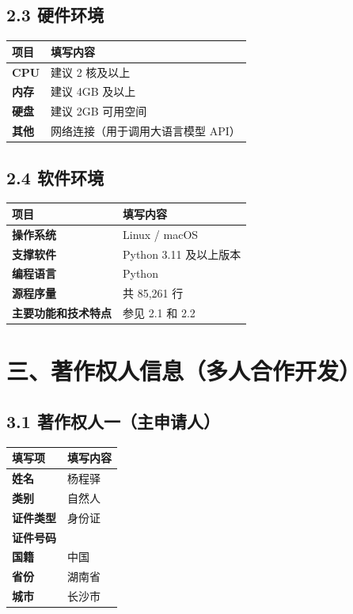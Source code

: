 \documentclass[zihao=-4,a4paper,fontset=none]{ctexart}
\begin{document}
\subsection*{2.3 硬件环境}

\begin{tabular}{>{\bfseries}l>{\raggedright\arraybackslash}p{11cm}}
  \toprule
  项目 & 填写内容 \\
  \midrule
  CPU & 建议 2 核及以上 \\
  内存 & 建议 4GB 及以上 \\
  硬盘 & 建议 2GB 可用空间 \\
  其他 & 网络连接（用于调用大语言模型 API） \\
  \bottomrule
\end{tabular}

\subsection*{2.4 软件环境}

\begin{tabular}{>{\bfseries}l>{\raggedright\arraybackslash}p{11cm}}
  \toprule
  项目 & 填写内容 \\
  \midrule
  操作系统 & Linux / macOS \\
  支撑软件 & Python 3.11 及以上版本 \\
  编程语言 & Python \\
  源程序量 & 共 85,261 行 \\
  主要功能和技术特点 & 参见 2.1 和 2.2 \\
  \bottomrule
\end{tabular}

\section*{三、著作权人信息（多人合作开发）}

\subsection*{3.1 著作权人一（主申请人）}

\begin{tabular}{>{\bfseries}l>{\raggedright\arraybackslash}p{11cm}}
  \toprule
  填写项 & 填写内容 \\
  \midrule
  姓名 & 杨程驿 \\
  类别 & 自然人 \\
  证件类型 & 身份证 \\
  证件号码 & 430622200703134876 \\
  国籍 & 中国 \\
  省份 & 湖南省 \\
  城市 & 长沙市 \\
  \bottomrule
\end{tabular}
\end{document}
